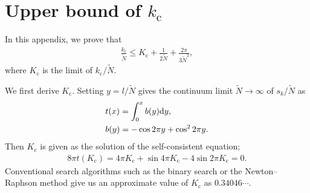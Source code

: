 
\section{Upper bound of $k_{\mathrm{c}}$}
\label{sec:bound_kc}
In this appendix, we prove that
\begin{align}
    \frac{k_{\mathrm{c}}}{\widetilde{N}}\leq K_{\mathrm{c}}+\frac{1}{2\widetilde{N}}+\frac{2\pi}{3\widetilde{N}^{2}},
\end{align}
where $K_{\mathrm{c}}$ is the limit of $k_{\mathrm{c}}/\widetilde{N}$.

We first derive $K_{\mathrm{c}}$. Setting $y=l/\widetilde{N}$ gives the continuum limit $\widetilde{N}\to\infty$ of $s_{k}/\widetilde{N}$ as
\begin{align}
    &t(x) = \int_{0}^{x}b(y)\mathrm{d} y,\\
    &b(y) = -\cos2\pi y+\cos^{2}2\pi y.
\end{align}
Then $K_{\mathrm{c}}$ is given as the solution of the self-consistent equation;
\begin{align}
    8\pi t(K_{\mathrm{c}})=4\pi K_{\mathrm{c}}+\sin 4\pi K_{\mathrm{c}}-4\sin 2\pi K_{\mathrm{c}}=0.
\end{align}
Conventional search algorithms such as the binary search or the Newton--Raphson method give us an approximate value of $K_{\mathrm{c}}$ as $0.34046\cdots$.

